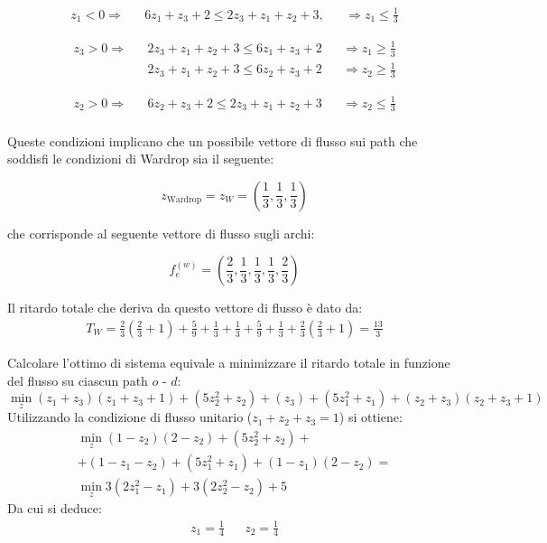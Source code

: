 \documentclass[11pt,largemargins]{homework}
\begin{document}
\begin{alphaparts}
  \begin{align*}
      z_1<0 \Rightarrow  && 6z_1 + z_3 + 2 \leq 2z_3+z_1+z_2+3,  && \Rightarrow z_1 \leq \frac{1}{3}
    \end{align*}

  \begin{align*}
    z_3>0 \Rightarrow && 2z_3+z_1+z_2+3 \leq 6z_1 + z_3 + 2 && \Rightarrow z_1 \geq \frac{1}{3}\\
    && 2z_3+z_1+z_2+3 \leq 6z_2 + z_3 + 2 && \Rightarrow z_2 \geq \frac{1}{3}
  \end{align*}

  \begin{align*}
    z_2>0 \Rightarrow && 6z_2 + z_3 + 2 \leq 2z_3+z_1+z_2+3 && \Rightarrow z_2 \leq \frac{1}{3}\\
  \end{align*}
  
  Queste condizioni implicano che un possibile vettore di flusso sui path che soddisfi le condizioni di Wardrop sia il seguente:

  \begin{equation*}
    z_{\text{Wardrop}} = z_W = \left(\frac{1}{3},\frac{1}{3},\frac{1}{3}\right)
  \end{equation*}

  che corrisponde al seguente vettore di flusso sugli archi:

  \begin{equation*}
    f_e^{(w)}=\left(\frac{2}{3}, \frac{1}{3}, \frac{1}{3}, \frac{1}{3}, \frac{2}{3}\right)
  \end{equation*}

  Il ritardo totale che deriva da questo vettore di flusso è dato da:
  \begin{align*}
    T_W=\frac{2}{3}\left(\frac{2}{3}+1 \right) + \frac{5}{9} + \frac{1}{3} + \frac{1}{3} + \frac{5}{9} + \frac{1}{3} + \frac{2}{3}\left(\frac{2}{3}+1 \right) = \frac{13}{3}
  \end{align*}
  \questionpart

  Calcolare l'ottimo di sistema equivale a minimizzare il ritardo totale in funzione del flusso su ciascun path \(o\) - \(d\):
  \begin{equation*}
    \min\limits_z (z_1+z_3)(z_1+z_3+1)+(5z_2^2+z_2)+(z_3)+(5z_1^2+z_1)+(z_2+z_3)(z_2+z_3+1)
  \end{equation*}
  Utilizzando la condizione di flusso unitario (\(z_1+z_2+z_3=1\)) si ottiene:
  \begin{gather*}
    \min\limits_z (1-z_2)(2-z_2)+(5z_2^2+z_2)+\\
    +(1-z_1-z_2)+(5z_1^2+z_1)+(1-z_1)(2-z_2)=\\
    \min\limits_z 3(2z_1^2-z_1)+3(2z_2^2-z_2)+5
  \end{gather*}
  Da cui si deduce:
  \begin{align*}
    z_1=\frac{1}{4} && z_2 = \frac{1}{4}
  \end{align*}


\end{alphaparts}
\end{document}
